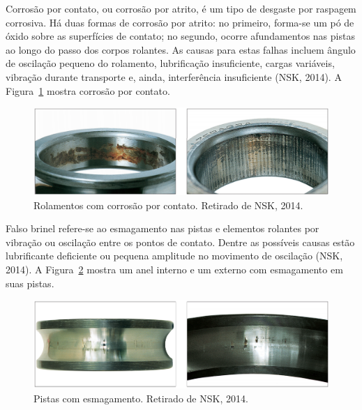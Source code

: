 \documentclass[
	12pt,				
	oneside,			
	a4paper,			
	english,			
	brazil,			
	]{abntex2ppgsi}
\begin{document}


Corrosão por contato, ou corrosão por atrito, é um tipo de desgaste por raspagem corrosiva. Há duas formas de corrosão por atrito: no primeiro, forma-se um pó de óxido sobre as superfícies de contato; no segundo, ocorre afundamentos nas pistas ao longo do passo dos corpos rolantes. As causas para estas falhas incluem ângulo de oscilação pequeno do rolamento, lubrificação insuficiente, cargas variáveis, vibração durante transporte e, ainda, interferência insuficiente (NSK, 2014). A Figura~\ref{corrosao_nsk} mostra corrosão por contato.

\begin{figure}[H]
\centering
\includegraphics[width=\textwidth,height=\textheight,keepaspectratio]{corrosao_nsk}
\caption {Rolamentos com corrosão por contato. Retirado de NSK, 2014.}
\label{corrosao_nsk}
\end{figure}

Falso brinel refere-se ao esmagamento nas pistas e elementos rolantes por vibração ou oscilação entre os pontos de contato. Dentre as possíveis causas estão lubrificante deficiente ou pequena amplitude no movimento de oscilação (NSK, 2014). A Figura~\ref{esmagamento_nsk} mostra um anel interno e um externo com esmagamento em suas pistas.

\begin{figure}[H]
\centering
\includegraphics[width=\textwidth,height=\textheight,keepaspectratio]{esmagamento_nsk}
\caption {Pistas com esmagamento. Retirado de NSK, 2014.}
\label{esmagamento_nsk}
\end{figure}
\end{document}
